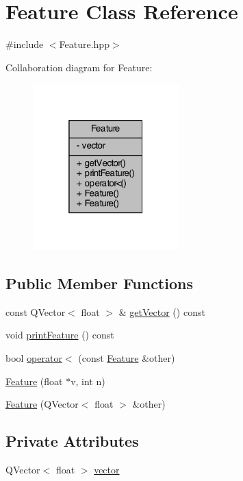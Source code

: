 \hypertarget{class_feature}{\section{Feature Class Reference}
\label{class_feature}
}


{\ttfamily \#include $<$Feature.\+hpp$>$}



Collaboration diagram for Feature\+:
\nopagebreak
\begin{figure}[H]
\begin{center}
\leavevmode
\includegraphics[width=160pt]{class_feature__coll__graph}
\end{center}
\end{figure}
\subsection*{Public Member Functions}
\begin{DoxyCompactItemize}
\item 
const Q\+Vector$<$ float $>$ \& \hyperlink{class_feature_ab96106b9d1ba89cfa00ffb63a26b2130}{get\+Vector} () const 
\item 
void \hyperlink{class_feature_a0e73c5cb157120a30704efb4af866ec0}{print\+Feature} () const 
\item 
bool \hyperlink{class_feature_a5bb49b85cd5b7be97899edf4222f110f}{operator$<$} (const \hyperlink{class_feature}{Feature} \&other)
\item 
\hyperlink{class_feature_a81b7327d95ee32b3e8da711aa77b6561}{Feature} (float $\ast$v, int n)
\item 
\hyperlink{class_feature_afb380f7d2b8fc2d0044a47edf36ea450}{Feature} (Q\+Vector$<$ float $>$ \&other)
\end{DoxyCompactItemize}
\subsection*{Private Attributes}
\begin{DoxyCompactItemize}
\item 
Q\+Vector$<$ float $>$ \hyperlink{class_feature_a8158dfca752942aeb84f35c363184d95}{vector}
\end{DoxyCompactItemize}


